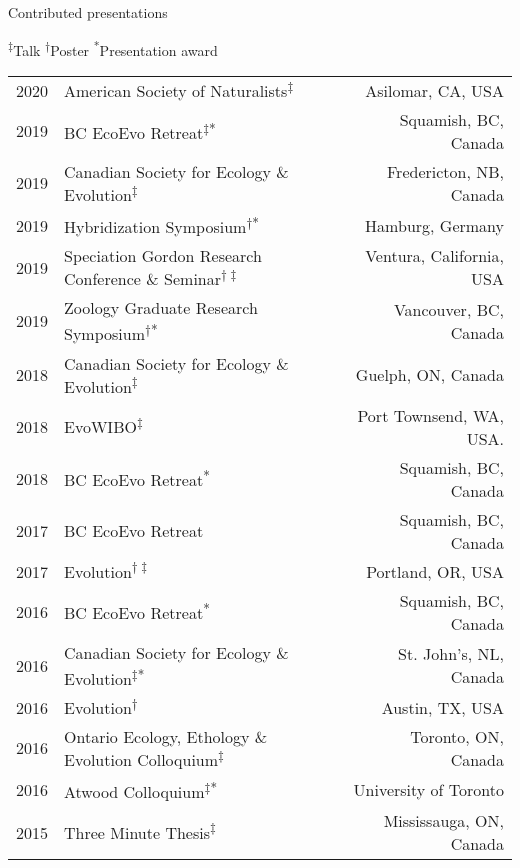 \documentclass[11pt]{article}
\begin{document}
\noindent
\begin{rSection}{Contributed presentations} %


\textsuperscript{$\ddagger$}Talk
\textsuperscript{$\dag$}Poster
\textsuperscript{*}Presentation award

\vspace{0.5em}
\noindent
\begin{tabular}{llr}

2020 & American Society of Naturalists\textsuperscript{$\ddagger$} & Asilomar, CA, USA\\
2019 & BC EcoEvo Retreat\textsuperscript{$\ddagger$}\textsuperscript{*} & Squamish, BC, Canada \\
2019 & Canadian Society for Ecology \& Evolution\textsuperscript{$\ddagger$} & Fredericton, NB, Canada\\
2019 & Hybridization Symposium\textsuperscript{$\dag$*} & Hamburg, Germany\\
2019 & Speciation Gordon Research Conference \& Seminar\textsuperscript{$\dag\ddagger$} & Ventura, California, USA\\
2019 & Zoology Graduate Research Symposium\textsuperscript{$\dag$*} & Vancouver, BC, Canada\\
2018 & Canadian Society for Ecology \& Evolution\textsuperscript{$\ddagger$} & Guelph, ON, Canada\\
2018 & EvoWIBO\textsuperscript{$\ddagger$} & Port Townsend, WA, USA.\\
2018 & BC EcoEvo Retreat\textsuperscript{*} & Squamish, BC, Canada \\
2017 & BC EcoEvo Retreat & Squamish, BC, Canada \\
2017 & Evolution\textsuperscript{$\dag\ddagger$} & Portland, OR, USA\\
2016 & BC EcoEvo Retreat\textsuperscript{*} & Squamish, BC, Canada \\
2016 & Canadian Society for Ecology \& Evolution\textsuperscript{$\ddagger$*} & St. John’s, NL, Canada\\
2016 & Evolution\textsuperscript{$\dag$} & Austin, TX, USA\\
2016 & Ontario Ecology, Ethology \& Evolution Colloquium\textsuperscript{$\ddagger$} & Toronto, ON, Canada\\
2016 & Atwood Colloquium\textsuperscript{$\ddagger$*} & University of Toronto\\
2015 & Three Minute Thesis\textsuperscript{$\ddagger$} & Mississauga, ON, Canada\\

\end{tabular}
\end{rSection}
\end{document}
